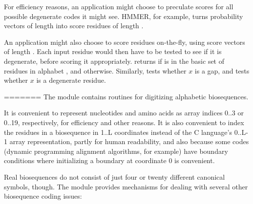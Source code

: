 For efficiency reasons, an application might choose to preculate
scores for all possible degenerate codes it might see. HMMER, for
example, turns probability vectors of length  into score
residues of length .

An application might also choose to score residues on-the-fly, using
score vectors of length . Each input residue  would
then have to be tested to see if it is degenerate, before scoring it
appropriately.   returns 
if  is in the basic set of  residues in alphabet
, and  otherwise. Similarly,
 tests whether $x$ is a gap, and
 tests whether $x$ is a degenerate
residue.

=======
The  module contains routines for digitizing
alphabetic biosequences.

It is convenient to represent nucleotides and amino acids as array
indices 0..3 or 0..19, respectively, for efficiency and other
reasons. It is also convenient to index the residues in a biosequence
in 1..L coordinates instead of the C language's 0..L-1 array
representation, partly for human readability, and also because some
codes (dynamic programming alignment algorithms, for example) have
boundary conditions where initializing a boundary at coordinate 0 is
convenient.

Real biosequences do not consist of just four or twenty different
canonical symbols, though. The  module provides
mechanisms for dealing with several other biosequence coding issues:

